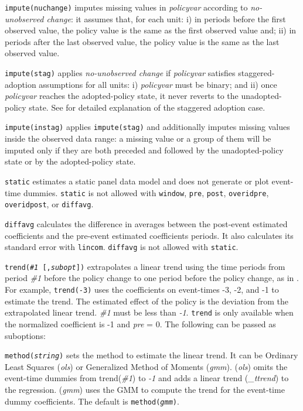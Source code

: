 \documentclass[bib]{./sty/statapress}
\begin{document}
\morehangpara
{\tt impute(nuchange)} imputes missing values in {\it policyvar} according to {\it no-unobserved change}: it assumes that, for each unit: i) in periods before the first observed value, the policy value is the same as the first observed value and; ii) in periods after the last observed value, the policy value is the same as the last observed value.

\morehangpara
{\tt impute(stag)} applies {\it no-unobserved change} if {\it policyvar} satisfies staggered-adoption assumptions for all units: i) {\it policyvar} must be binary; and ii) once {\it policyvar} reaches the adopted-policy state, it never reverts to the unadopted-policy state. See \citet{freyaldenhoven2021visualization} for detailed explanation of the staggered adoption case.

\morehangpara
{\tt impute(instag)} applies {\tt impute(stag)} and additionally imputes missing values inside the observed data range: a missing value or a group of them will be imputed only if they are both preceded and followed by the unadopted-policy state or by the adopted-policy state.

\hangpara
{\tt static} estimates a static panel data model and does not generate or plot event-time dummies.
{\tt static} is not allowed with {\tt window}, {\tt pre}, {\tt post}, {\tt overidpre}, {\tt overidpost}, or {\tt diffavg}.

\hangpara
{\tt diffavg} calculates the difference in averages between the post-event estimated coefficients and the pre-event estimated coefficients periods.
It also calculates its standard error with {\tt lincom}. {\tt diffavg} is not allowed with {\tt static}.

\hangpara
{\tt trend({\it \#1} [,{\it subopt}])} extrapolates a linear trend using the time periods from period {\it \#1} before the policy change to one period before the policy change, as in \citet{dobkin2018economic}.
For example, {\tt trend(-3)} uses the coefficients on event-times -3, -2, and -1 to estimate the trend.
The estimated effect of the policy is the deviation from the extrapolated linear trend.
{\it \#1} must be less than {\it -1}.
{\tt trend} is only available when the normalized coefficient is -1 and {\it pre} = 0.
The following can be passed as suboptions:

\morehangpara
{\tt method({\it string})} sets the method to estimate the linear trend. It can be Ordinary Least Squares ({\it ols}) or Generalized Method of Moments ({\it gmm}). ({\it ols}) omits the event-time dummies from trend({\it \#1}) to {\it -1} and adds a linear trend ({\it \_ttrend}) to the regression. ({\it gmm}) uses the GMM to compute the trend for the event-time dummy coefficients. The default is {\tt method({\it gmm})}.
\end{document}
